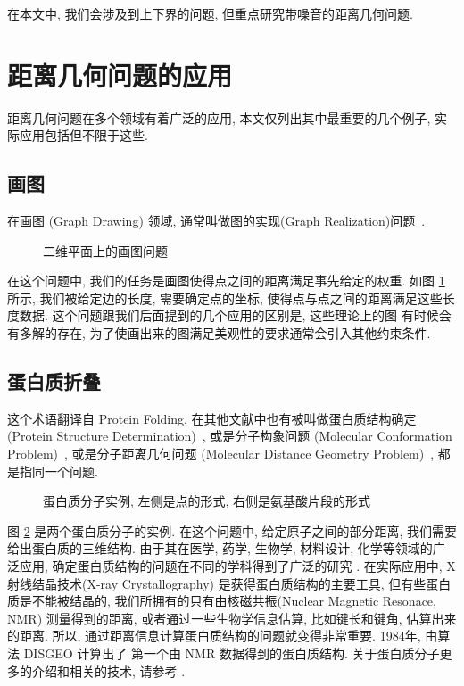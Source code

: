 \documentclass{CASthesis_zzk}
\begin{document}
在本文中, 我们会涉及到上下界的问题, 但重点研究带噪音的距离几何问题.


\section{距离几何问题的应用}
\label{sec:application}
距离几何问题在多个领域有着广泛的应用, 
本文仅列出其中最重要的几个例子, 实际应用包括但不限于这些.


\subsection{画图}
在画图 (Graph Drawing) 领域, 通常叫做图的实现(Graph Realization)问题~\cite{Gansner2005}.
\begin{figure}[htbp]
  \centering
  \caption{二维平面上的画图问题}
  \label{fig:GraphRealization}
\end{figure}
在这个问题中, 我们的任务是画图使得点之间的距离满足事先给定的权重.
如图 \ref{fig:GraphRealization} 所示, 我们被给定边的长度, 需要确定点的坐标,
使得点与点之间的距离满足这些长度数据.
这个问题跟我们后面提到的几个应用的区别是, 这些理论上的图
有时候会有多解的存在, 为了使画出来的图满足美观性的要求通常会引入其他约束条件.

\subsection{蛋白质折叠} 
这个术语翻译自 Protein Folding, 
在其他文献中也有被叫做蛋白质结构确定 (Protein Structure Determination)~\cite{Braun1987,Sit2011,Voller2013}, 
或是分子构象问题 (Molecular Conformation Problem)~\cite{Crippen1988,Biswas2008,Fang2013}, 
或是分子距离几何问题 (Molecular Distance Geometry Problem)~\cite{Dong2002,Dong2003,Carvalho2008},
都是指同一个问题.

\begin{figure}[htbp]
  \centering
  \caption{蛋白质分子实例, 左侧是点的形式, 右侧是氨基酸片段的形式}
  \label{fig:protein}
\end{figure}
图 \ref{fig:protein} 是两个蛋白质分子的实例. 
在这个问题中, 给定原子之间的部分距离, 我们需要给出蛋白质的三维结构.
由于其在医学, 药学, 生物学, 材料设计, 化学等领域的广泛应用,
确定蛋白质结构的问题在不同的学科得到了广泛的研究 \cite{schlick2010molecular}.
在实际应用中, X射线结晶技术(X-ray Crystallography)
是获得蛋白质结构的主要工具, 但有些蛋白质是不能被结晶的, 
我们所拥有的只有由核磁共振(Nuclear Magnetic Resonace, NMR) 测量得到的距离, 
或者通过一些生物学信息估算, 比如键长和键角, 估算出来的距离.
所以, 通过距离信息计算蛋白质结构的问题就变得非常重要.
1984年, 由算法 DISGEO \cite{havel1984distance} 计算出了
第一个由 NMR 数据得到的蛋白质结构.
关于蛋白质分子更多的介绍和相关的技术, 请参考 \cite{schlick2010molecular}.
\end{document}

